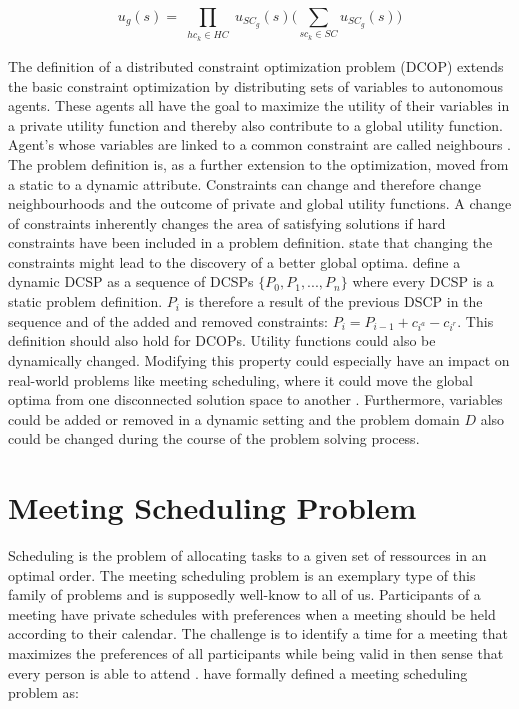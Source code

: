 \[ u_{g}(s) = \prod_{\substack{hc_{k} \in HC}} u_{SC_{g}}(s) \bigg( \sum_{sc_{k} \in SC} u_{SC_{g}}(s) \bigg)\] 


The definition of a distributed constraint optimization problem (DCOP) extends the basic constraint optimization by distributing sets of variables to autonomous agents. These agents all have the goal to maximize the utility of their variables in a private utility function and thereby also contribute to a global utility function. Agent's whose variables are linked to a common constraint are called neighbours \cite{Chapman2011, Farinelli, Petcu2003}.
\newline\newline 
The problem definition is, as a further extension to the optimization, moved from a static to a dynamic attribute. Constraints can change and  therefore change neighbourhoods and the outcome of private and global utility functions. A change of constraints inherently changes the area of satisfying solutions if hard constraints have been included in a problem definition. \cite{Nguyen2012} state that changing the constraints might lead to the discovery of a better global optima. \cite{Maillera} define a dynamic DCSP as a sequence of DCSPs \(\{P_{0}, P_{1}, ..., P_{n}\}\) where every DCSP is a static problem definition. \(P_{i}\) is therefore a result of the previous DSCP in the sequence and of the added and removed constraints: \(P_{i} = P_{i-1} + c_{i^{a}} - c_{i^{r}}\). This definition should also hold for DCOPs. Utility functions could also be dynamically changed. Modifying this property could especially have an impact on real-world problems like meeting scheduling, where it could move the global optima from one disconnected solution space to another \cite{Nguyen2012}. Furthermore, variables could be added or removed in a dynamic setting and the problem domain \(D\) also could be changed during the course of the problem solving process.

\section{Meeting Scheduling Problem}  

Scheduling is the problem of allocating tasks to a given set of ressources in an optimal order. The meeting scheduling problem is an exemplary type of this family of problems and is supposedly well-know to all of us. Participants of a meeting have private schedules with preferences when a meeting should be held according to their calendar. The challenge is to identify a time for a meeting that maximizes the preferences of all participants while being valid in then sense that every person is able to attend \cite{Farinelli}. \cite{Scheduling} have formally defined a meeting scheduling problem as:

